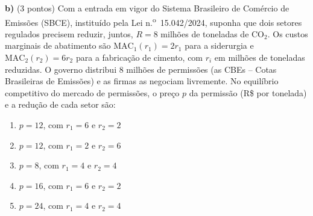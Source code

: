 \textbf{b)} (3 pontos) Com a entrada em vigor do Sistema Brasileiro de Com\'ercio de Emiss\~oes (SBCE), institu\'ido pela Lei n.\textsuperscript{o}~15.042/2024, suponha que dois setores regulados precisem reduzir, juntos, $R = 8$ milh\~oes de toneladas de CO$_2$. Os custos marginais de aba\-ti\-men\-to s\~ao $\text{MAC}_1(r_1) = 2 r_1$ para a siderurgia e $\text{MAC}_2(r_2) = 6 r_2$ para a fabrica\c{c}\~ao de cimento, com $r_i$ em milh\~oes de toneladas reduzidas. O governo distribui 8 milh\~oes de permiss\~oes (as CBEs -- Cotas Brasileiras de Emiss\~oes) e as firmas as negociam livremente. No equil\'ibrio competitivo do mercado de permiss\~oes, o pre\c{c}o $p$ da permiss\~ao (R\$ por tonelada) e a redu\c{c}\~ao de cada setor s\~ao:

\begin{enumerate}[label=\Alph*., leftmargin=3.2em, itemsep=0.15em, topsep=0.2em]
  \item $p = 12$, com $r_1 = 6$ e $r_2 = 2$
  \item $p = 12$, com $r_1 = 2$ e $r_2 = 6$
  \item $p = 8$, com $r_1 = 4$ e $r_2 = 4$
  \item $p = 16$, com $r_1 = 6$ e $r_2 = 2$
  \item $p = 24$, com $r_1 = 4$ e $r_2 = 4$
\end{enumerate}
